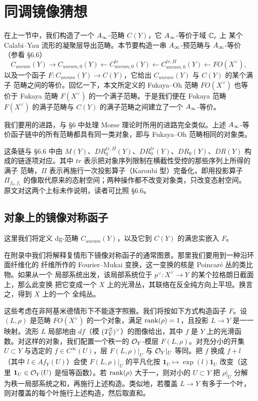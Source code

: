 \section{同调镜像猜想}

在上一节中，我们构造了一个 $A_{\infty}$-范畴 $C(Y)$，它 $A_{\infty}$-等价于域 $\mathbb{C}_{\varepsilon}$ 上
某个 Calabi--Yau 流形的凝聚层导出范畴。本节要构造一串 $A_{\infty}$-预范畴与
$A_{\infty}$-等价（参看 §6.6）
\[
  C_{unram}(Y)\to C_{unram,0}(Y)\leftarrow C^{tr}_{unram,0}(Y)
  \leftarrow C^{tr,\Pi}_{unram,0}(Y)\leftarrow FO(X^{\vee}),
\]
以及一个函子 $F:C_{unram}(Y)\to C(Y)$，它给出 $C_{unram}(Y)$ 与 $C(Y)$ 的某个满子
范畴之间的等价。回忆一下，本文所定义的 Fukaya--Oh 范畴 $FO(X^{\vee})$ 也等价于
Fukaya 范畴 $F(X^{\vee})$ 的一个满子范畴。于是我们便在 Fukaya 范畴 $F(X^{\vee})$
的满子范畴与 $C(Y)$ 的满子范畴之间建立了一个 $A_{\infty}$-等价。

我们要用的进路，与 §6 中处理 Morse 理论时所用的进路完全类似。上述
$A_{\infty}$-等价函子链中的所有范畴都具有同一类对象，即与 Fukaya--Oh 范畴相同的对象类。

\begin{yizhu}[链中的上标 $tr$ 与 $\Pi$]
这条链与 §6.6 中由 $M(Y)$、$DR^{tr,\Pi}_0(Y)$、$DR^{tr}_0(Y)$、$DR_0(Y)$、$DR(Y)$
构成的链逐项对应。其中 $tr$ 表示把对象序列限制在横截性受控的那些序列上所得的满子
范畴，$\Pi$ 表示再施行一次投影算子（Karoubi 型）完备化，即用投影算子
$\Pi_{f_0,f_1}$ 的像取代原来的态射空间；两种操作都不改变对象类，只改变态射空间。
原文对这两个上标未作说明，读者可比照 §6.6。
\end{yizhu}

\subsection{对象上的镜像对称函子}

这里我们将定义 dg-范畴 $C_{unram}(Y)$，以及它到 $C(Y)$ 的满忠实嵌入 $F$。

在附录中我们将解释复情形下镜像对称函子的通常图景。那里我们要用到一种沿环面纤维化的
纤维所作的 Fourier--Mukai 变换，这一变换的核是 Poincaré 丛的类比物。如果从一个
局部系统出发，该局部系统位于 $p^{\vee}:X^{\vee}\to Y$ 的某个拉格朗日截面上，那么此变换
把它变成一个 $X$ 上的光滑丛，其联络在反全纯方向上平坦。换言之，得到 $X$ 上的一个
全纯丛。

这些考虑在非阿基米德情形下不能逐字照搬。我们将按如下方式构造函子 $F$。设
$(L,\rho)$ 是范畴 $FO(X^{\vee})$ 的一个对象，满足 $\operatorname{rank}(\rho)=1$，且投影
$L\to Y$ 是一一映射。流形 $L$ 局部地由 $df$（模 $(T^{\mathbb{Z}}_Y)^{\vee}$）的图像给出，其中
$f$ 是 $Y$ 上的光滑函数。对这样的对象，我们配置一个秩一的 $\mathcal{O}_Y$-模层
$F(L,\rho)$。对充分小的开集 $U\subset Y$ 与选定的 $f\in C^{\infty}(U)$，层
$F(L,\rho)|_U$ 与 $\mathcal{O}_Y|_U$ 等同。把 $f$ 换成 $f+l$（其中 $l\in Af_Y(U)$）会使
$F(L,\rho)|_U$ 的平凡化按 $\mathbf{1}_U\mapsto\exp(l)\mathbf{1}_U$ 改变（这里
$\mathbf{1}_U\in\mathcal{O}_Y(U)$ 是恒等函数）。若 $\operatorname{rank}(\rho)$ 大于一，则对小的
$U\subset Y$ 把 $\rho|_U$ 分解为秩一局部系统之和，再施行上述构造。类似地，若覆盖
$L\to Y$ 有多于一个叶，则对覆盖的每个叶施行上述构造，然后取直和。

